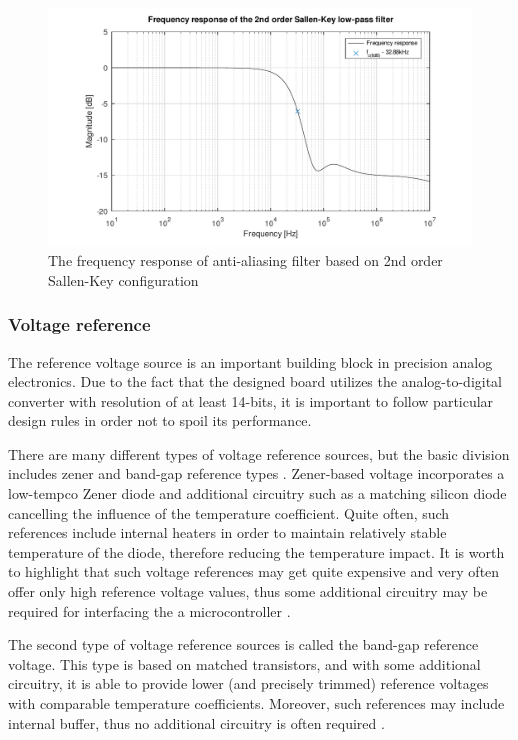 \documentclass[12pt,a4paper]{article}
\begin{document}
\begin{figure}[ht!]
\includegraphics[scale=0.77]{sallenresponse.pdf}
\caption{The frequency response of anti-aliasing filter based on 2nd order Sallen-Key configuration}
\label{fig:sallenresponse}
\end{figure}

\subsubsection{Voltage reference}

The reference voltage source is an important building block in precision analog electronics. Due to the fact that the designed board utilizes the analog-to-digital converter with resolution of at least 14-bits, it is important to follow particular design rules in order not to spoil its performance.
\par

There are many different types of voltage reference sources, but the basic division includes zener and band-gap reference types \cite{companion}. Zener-based voltage incorporates a low-tempco Zener diode and additional circuitry such as a matching silicon diode cancelling the influence of the temperature coefficient. Quite often, such references include internal heaters in order to maintain relatively stable temperature of the diode, therefore reducing the temperature impact. It is worth to highlight that such voltage references may get quite expensive and very often offer only high reference voltage values, thus some additional circuitry may be required for interfacing the a microcontroller \cite{companion}.
\par

The second type of voltage reference sources is called the band-gap reference voltage. This type is based on matched transistors, and with some additional circuitry, it is able to provide lower (and precisely trimmed) reference voltages with comparable temperature coefficients. Moreover, such references may include internal buffer, thus no additional circuitry is often required \cite{companion}.
\par
\end{document}
